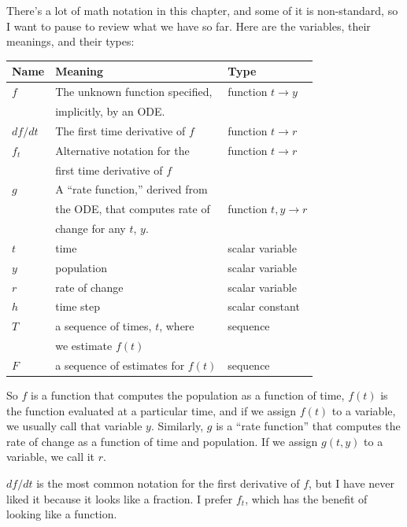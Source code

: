 There's a lot of math notation in this chapter, and some of it is
non-standard, so I want to pause to review what we have so far.
Here are the variables, their meanings, and their types:

\begin{tabular}{|l|l|l|}
\hline
Name   & Meaning       & Type \\
\hline \hline
$f$   & The unknown function specified,  & function $t \to y$ \\
    & implicitly, by an ODE.       &  \\\hline

$df/dt$ & The first time derivative of $f$ & function $t \to r$ \\ \hline

$f_t$ & Alternative notation for the  & function $t \to r$ \\ 
    & first time derivative of $f$  & \\ \hline


$g$   & A ``rate function,'' derived from   & \\
    & the ODE, that computes rate of   & function $t, y \to r$ \\
    & change for any $t$, $y$.      &  \\\hline

$t$   & time      & scalar variable \\\hline
$y$   & population      & scalar variable \\\hline
$r$   & rate of change      & scalar variable \\\hline

$h$   & time step      & scalar constant \\\hline
$T$   & a sequence of times, $t$, where  & sequence \\
       & we estimate $f(t)$  &      \\\hline
$F$   & a sequence of estimates for $f(t)$ & sequence \\
\hline
\end{tabular}

So $f$ is a function that computes the population as a function of
time, $f(t)$ is the function evaluated at a particular time, and if we
assign $f(t)$ to a variable, we usually call that variable $y$.
Similarly, $g$ is a ``rate function'' that computes the rate of change as a
function of time and population. If we assign $g(t,y)$ to a variable,
we call it $r$.

$df/dt$ is the most common notation for the first derivative of $f$,
but I have never liked it because it looks like a fraction. I
prefer $f_t$, which has the benefit of looking like a function.

